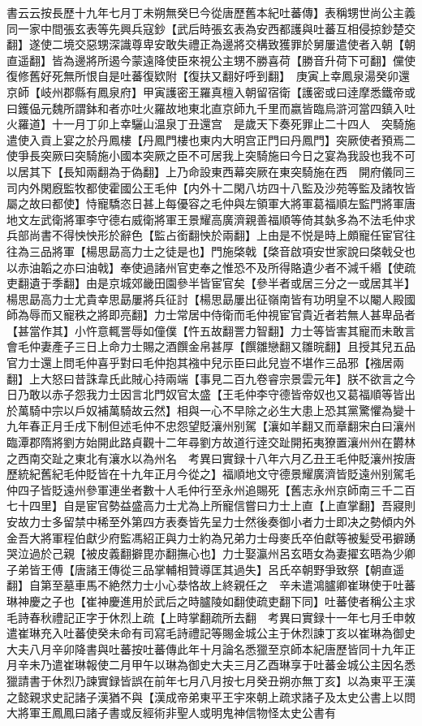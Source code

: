 書云云按長歷十九年七月丁未朔無癸巳今從唐歷舊本紀吐蕃傳】表稱甥世尚公主義同一家中間張玄表等先興兵寇鈔【武后時張玄表為安西都護與吐蕃互相侵掠鈔楚交翻】遂使二境交惡甥深識尊卑安敢失禮正為邊將交構致獲罪於舅屢遣使者入朝【朝直遥翻】皆為邊將所遏今蒙遠降使臣來視公主甥不勝喜荷【勝音升荷下可翻】儻使復修舊好死無所恨自是吐蕃復欵附【復扶又翻好呼到翻】　庚寅上幸鳳泉湯癸卯還京師【岐州郡縣有鳳泉府】甲寅護密王羅真檀入朝留宿衛【護密或曰逹摩悉鐵帝或曰鑊偘元魏所謂鉢和者亦吐火羅故地東北直京師九千里而嬴皆臨烏滸河當四鎮入吐火羅道】十一月丁卯上幸驪山温泉丁丑還宫　是歲天下奏死罪止二十四人　突騎施遣使入貢上宴之於丹鳳樓【丹鳳門樓也東内大明宫正門曰丹鳳門】突厥使者預焉二使爭長突厥曰突騎施小國本突厥之臣不可居我上突騎施曰今日之宴為我設也我不可以居其下【長知兩翻為于偽翻】上乃命設東西幕突厥在東突騎施在西　開府儀同三司内外閑廐監牧都使霍國公王毛仲【内外十二閑八坊四十八監及沙苑等監及諸牧皆屬之故曰都使】恃寵驕恣日甚上每優容之毛仲與左領軍大將軍葛福順左監門將軍唐地文左武衛將軍李守德右威衛將軍王景耀高廣濟親善福順等倚其埶多為不法毛仲求兵部尚書不得怏怏形於辭色【監占銜翻怏於兩翻】上由是不悦是時上頗寵任宦官往往為三品將軍【楊思勗高力士之徒是也】門施棨戟【棨音啟項安世家說曰棨戟殳也以赤油韜之亦曰油戟】奉使過諸州官吏奉之惟恐不及所得賂遺少者不減千緡【使疏吏翻遺于季翻】由是京城郊畿田園參半皆宦官矣【參半者或居三分之一或居其半】楊思勗高力士尤貴幸思勗屢將兵征討【楊思勗屢出征嶺南皆有功明皇不以閹人殿國師為辱而又寵秩之將即亮翻】力士常居中侍衛而毛仲視宦官貴近者若無人甚卑品者【甚當作其】小忤意輒詈辱如僮僕【忤五故翻詈力智翻】力士等皆害其寵而未敢言會毛仲妻產子三日上命力士賜之酒饌金帛甚厚【饌雛戀翻又雛晥翻】且授其兒五品官力士還上問毛仲喜乎對曰毛仲抱其襁中兒示臣曰此兒豈不堪作三品邪【襁居兩翻】上大怒曰昔誅韋氏此賊心持兩端【事見二百九卷睿宗景雲元年】朕不欲言之今日乃敢以赤子怨我力士因言北門奴官太盛【王毛仲李守德皆帝奴也又葛福順等皆出於萬騎中宗以戶奴補萬騎故云然】相與一心不早除之必生大患上恐其黨驚懼為變十九年春正月壬戌下制但述毛仲不忠怨望貶瀼州别駕【瀼如羊翻又而章翻宋白曰瀼州臨潭郡隋將劉方始開此路貞觀十二年尋劉方故道行逹交趾開拓夷獠置瀼州州在欝林之西南交趾之東北有瀼水以為州名　考異曰實録十八年六月乙丑王毛仲貶瀼州按唐歷統紀舊紀毛仲貶皆在十九年正月今從之】福順地文守德景耀廣濟皆貶遠州别駕毛仲四子皆貶遠州參軍連坐者數十人毛仲行至永州追賜死【舊志永州京師南三千二百七十四里】自是宦官勢益盛高力士尤為上所寵信嘗曰力士上直【上直掌翻】吾寢則安故力士多留禁中稀至外第四方表奏皆先呈力士然後奏御小者力士即决之勢傾内外金吾大將軍程伯獻少府監馮紹正與力士約為兄弟力士母麥氏卒伯獻等被髪受弔擗踴哭泣過於己親【被皮義翻擗毘亦翻撫心也】力士娶瀛州呂玄晤女為妻擢玄晤為少卿子弟皆王傅【唐諸王傳從三品掌輔相贊導匡其過失】呂氏卒朝野爭致祭【朝直遥翻】自第至墓車馬不絶然力士小心㳟恪故上終親任之　辛未遣鴻臚卿崔琳使于吐蕃琳神慶之子也【崔神慶進用於武后之時臚陵如翻使疏吏翻下同】吐蕃使者稱公主求毛詩春秋禮記正字于休烈上疏【上時掌翻疏所去翻　考異曰實録十一年七月壬申敇遣崔琳充入吐蕃使癸未命有司寫毛詩禮記等賜金城公主于休烈諫丁亥以崔琳為御史大夫八月辛卯降書與吐蕃按吐蕃傳此年十月論名悉獵至京師本紀唐歷皆同十九年正月辛未乃遣崔琳報使二月甲午以琳為御史大夫三月乙酉琳享于吐蕃金城公主因名悉獵請書于休烈乃諫實録皆誤在前年七月八月按七月癸丑朔亦無丁亥】以為東平王漢之懿親求史記諸子漢猶不與【漢成帝弟東平王宇來朝上疏求諸子及太史公書上以問大將軍王鳳鳳曰諸子書或反經術非聖人或明鬼神信物怪太史公書有